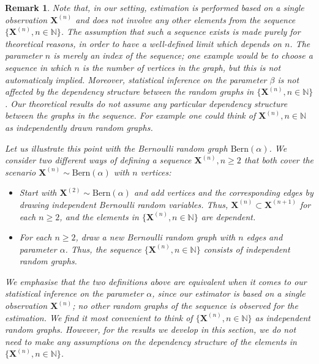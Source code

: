\documentclass{article}
\newtheorem{Remark}[Theorem]{Remark}
\begin{document}
\begin{Remark}
    Note that, in our setting, estimation is performed based on a single observation $\mathbf{X}^{(n)}$ and does not involve any other elements from the sequence $\{ \mathbf{X}^{(n)}, n \in \mathbb{N} \}$. The assumption that such a sequence exists is made purely for theoretical reasons, in order to have a well-defined limit which depends on $n$. The parameter $n$ is merely an index of the sequence; one example would be to choose a sequence in which $n$ is the number of vertices in the graph, but this is not automaticaly implied. Moreover, statistical inference on the parameter $\beta$ is not affected by the dependency structure between the random graphs in $\{ \mathbf{X}^{(n)}, n \in \mathbb{N} \}$. Our theoretical results do not assume any particular dependency structure between the graphs in the sequence. For example one could think of $\mathbf{X}^{(n)}, n \in \mathbb{N}$ as independently drawn random graphs. 
    
    Let us illustrate this point with the Bernoulli random graph $\mathrm{Bern}(\alpha)$. We consider two different ways of defining a sequence $\mathbf{X}^{(n)}, n \geq 2$ that both cover the scenario $\mathbf{X}^{(n)}\sim \mathrm{Bern}(\alpha)$ with $n$ vertices:
    \begin{itemize}
        \item Start with $\mathbf{X}^{(2)}\sim \mathrm{Bern}(\alpha)$ and add vertices and the corresponding edges by drawing independent Bernoulli random variables. Thus, $\mathbf{X}^{(n)} \subset \mathbf{X}^{(n+1)}$ for each $n \geq 2$, and the elements in  $\{ \mathbf{X}^{(n)}, n \in \mathbb{N} \}$ are dependent.
        \item For each $n \geq 2$, draw a new Bernoulli random graph with $n$ edges and parameter $\alpha$. Thus,  the sequence  $\{ \mathbf{X}^{(n)}, n \in \mathbb{N} \}$ consists of independent random graphs.
    \end{itemize}
    We emphasise that the two definitions above are equivalent when it comes to our statistical inference on the parameter $\alpha$, since our  estimator is based on a single observation $\mathbf{X}^{(n)}$;  no other random graphs of the sequence is observed for the estimation. We find it most convenient to think of $\{ \mathbf{X}^{(n)}, n \in \mathbb{N} \}$ as independent random graphs. However, for the results we develop in this section, we do not need to make any assumptions on the dependency structure of the elements in $\{ \mathbf{X}^{(n)}, n \in \mathbb{N} \}$. 
\end{Remark}
\end{document}
